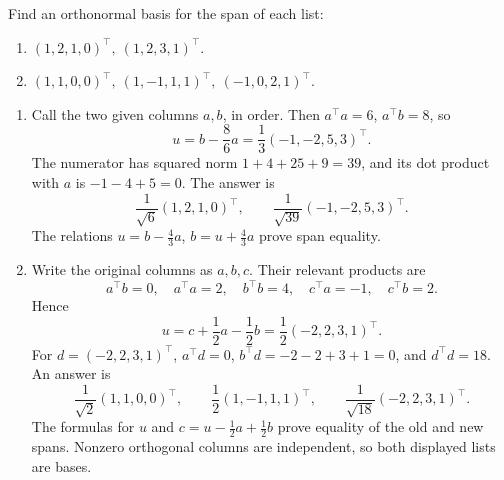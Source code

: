 \begin{problem}\label{ex:06:gs-r4}
Find an orthonormal basis for the span of each list:
\begin{enumerate}
\item \((1,2,1,0)^\top,\ (1,2,3,1)^\top\).
\item \((1,1,0,0)^\top,\ (1,-1,1,1)^\top,\ (-1,0,2,1)^\top\).
\end{enumerate}
\end{problem}
\begin{solution}
\begin{enumerate}
\item Call the two given columns \(a,b\), in order.
Then \(a^\top a=6\), \(a^\top b=8\), so
\[
u=b-\frac86a=\frac13(-1,-2,5,3)^\top.
\]
The numerator has squared norm \(1+4+25+9=39\), and its dot product
with \(a\) is \(-1-4+5=0\).
The answer is
\[
\frac1{\sqrt6}(1,2,1,0)^\top,\qquad
\frac1{\sqrt{39}}(-1,-2,5,3)^\top.
\]
The relations \(u=b-\frac43a\), \(b=u+\frac43a\) prove span equality.
\item Write the original columns as \(a,b,c\).
Their relevant products are
\[
a^\top b=0,\quad a^\top a=2,\quad b^\top b=4,\quad
c^\top a=-1,\quad c^\top b=2.
\]
Hence
\[
u=c+\frac12a-\frac12b=\frac12(-2,2,3,1)^\top.
\]
For \(d=(-2,2,3,1)^\top\), \(a^\top d=0\),
\(b^\top d=-2-2+3+1=0\), and \(d^\top d=18\).
An answer is
\[
\frac1{\sqrt2}(1,1,0,0)^\top,\qquad
\frac12(1,-1,1,1)^\top,\qquad
\frac1{\sqrt{18}}(-2,2,3,1)^\top.
\]
The formulas for \(u\) and \(c=u-\frac12a+\frac12b\) prove equality
of the old and new spans. Nonzero orthogonal columns are independent,
so both displayed lists are bases.
\end{enumerate}
\end{solution}

